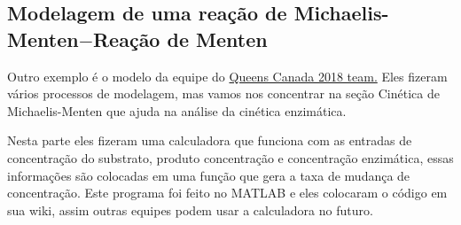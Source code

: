 \documentclass[11pt, letterpaper, portuguese]{article}
\begin{document}
    \subsection{Modelagem de uma reação de Michaelis-Menten\texorpdfstring{$-$}{Lg}Reação de Menten}
    \par {Outro exemplo é o modelo da equipe do \href{https://2018.igem.org/Team:Queens_Canada/Michaelis-Menten_Kinetics}{Queens Canada 2018 team.} Eles fizeram vários processos de modelagem, mas vamos nos concentrar na seção Cinética de Michaelis-Menten que ajuda na análise da cinética enzimática.} 
    \par {Nesta parte eles fizeram uma calculadora que funciona com as entradas de concentração do substrato, produto concentração e concentração enzimática, essas informações são colocadas em uma função que gera a taxa de mudança de concentração. Este programa foi feito no MATLAB e eles colocaram o código em sua wiki, assim outras equipes podem usar a calculadora no futuro.}
    
\end{document}
